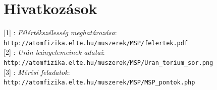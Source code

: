 \documentclass[12pt,a4paper]{article}
\begin{document}
\section*{Hivatkozások}
\hspace*{14pt} [1] : \emph{Félértékszélesség meghatározása}:\\
\hspace*{34pt} \texttt{http://atomfizika.elte.hu/muszerek/MSP/felertek.pdf}\\

[2] : \emph{Urán leányelemeinek adatai}:\\
\hspace*{34pt} \texttt{http://atomfizika.elte.hu/muszerek/MSP/Uran\_torium\_sor.png}\\

[3] : \emph{Mérési feladatok}:\\
\hspace*{34pt} \texttt{http://atomfizika.elte.hu/muszerek/MSP/MSP\_pontok.php}
\end{document}
